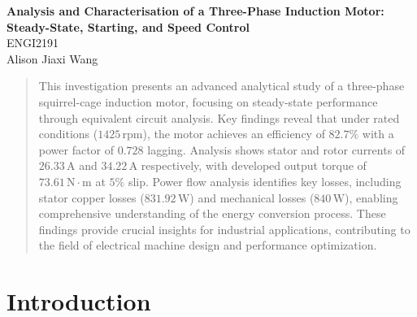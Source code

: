 \documentclass[a4paper,12pt]{article}
\begin{document}
\begin{center}
    \LARGE\textbf{Analysis and Characterisation of a Three-Phase Induction Motor: Steady-State, Starting, and Speed Control}
\\
   \large ENGI2191 \\
      Alison Jiaxi Wang \\
 
    \end{center}
 

 
   

\pagestyle{fancy}
\AtEndDocument{%
  \fancyfoot[R]{}
}
\renewcommand{\headrulewidth}{0pt}
\renewcommand{\footrulewidth}{0pt}
\begin{abstract}
    This investigation presents an advanced analytical study of a three-phase squirrel-cage induction motor, focusing on steady-state performance through equivalent circuit analysis. Key findings reveal that under rated conditions ($1425\,\text{rpm}$), the motor achieves an efficiency of $82.7\%$ with a power factor of $0.728$ lagging. Analysis shows stator and rotor currents of $26.33\,\text{A}$ and $34.22\,\text{A}$ respectively, with developed output torque of $73.61\,\text{N}\cdot\text{m}$ at $5\%$ slip. Power flow analysis identifies key losses, including stator copper losses ($831.92\,\text{W}$) and mechanical losses ($840\,\text{W}$), enabling comprehensive understanding of the energy conversion process. These findings provide crucial insights for industrial applications, contributing to the field of electrical machine design and performance optimization.
\end{abstract}


\setcounter{tocdepth}{1}
\tableofcontents
 
 
 
\section{Introduction}
\label{sec:introduction}
\end{document}
